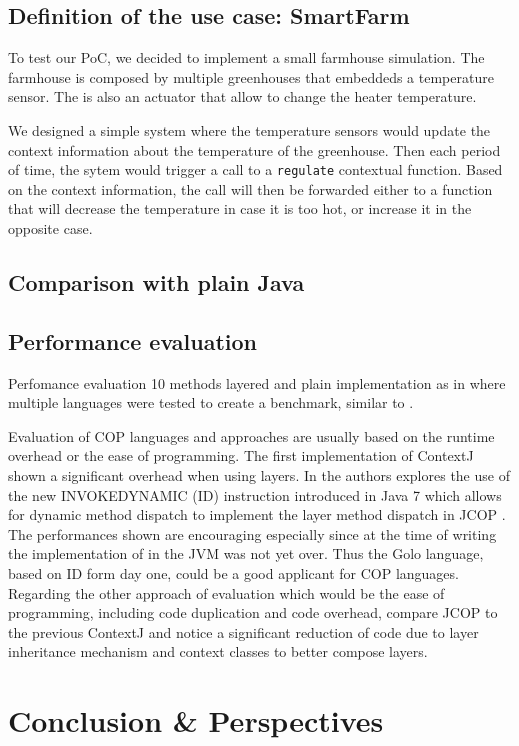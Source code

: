 \documentclass[a4paper]{article}
\begin{document}
\subsection{Definition of the use case: SmartFarm}

To test our PoC, we decided to implement a small farmhouse simulation. The farmhouse is composed by multiple greenhouses that embeddeds a temperature sensor. The is also an actuator that allow to change the heater temperature.

We designed a simple system where the temperature sensors would update the context information about the temperature of the greenhouse. Then each period of time, the sytem would trigger a call to a \lstinline|regulate| contextual function. Based on the context information, the call will then be forwarded either to a function that will decrease the temperature in case it is too hot, or increase it in the opposite case.

\subsection{Comparison with plain Java}

\subsection{Performance evaluation}

Perfomance evaluation
10 methods layered and plain implementation as in \cite{appeltauer_comparison_2009} where multiple languages were tested to create a benchmark, similar to \cite{kamina_eventcj:_2011}.

Evaluation of COP languages and approaches are usually based on the runtime overhead or the ease of programming. The first implementation of ContextJ \cite{haupt_contextj:_2011} shown a significant overhead when using layers. In \cite{appeltauer_layered_2010} the authors explores the use of the new INVOKEDYNAMIC (ID) instruction introduced in Java 7 which allows for dynamic method dispatch to implement the layer method dispatch in JCOP \cite{appeltauer_declarative_2013}. The performances shown are encouraging especially since at the time of writing the implementation of in the JVM was not yet over. Thus the Golo language, based on ID form day one, could be a good applicant for COP languages. Regarding the other approach of evaluation which would be the ease of programming, including code duplication and code overhead, \cite{appeltauer_declarative_2013} compare JCOP to the previous ContextJ and notice a significant reduction of code due to layer inheritance mechanism and context classes to better compose layers.

\section{Conclusion \& Perspectives}
\label{section:conclusion}


%
%



\end{document}
